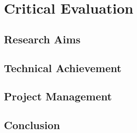 \chapter{Critical Evaluation}
%
%
%
%
%

\section{Research Aims}

\section{Technical Achievement}

\section{Project Management}

\section{Conclusion}